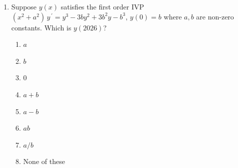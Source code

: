 \documentclass{ximera}
\begin{document}
\begin{enumerate}[label=(\arabic*)]


\newpage

\item Suppose $y(x)$ satisfies the first order IVP $(x^2+a^2)\,y^{\,\prime}=y^3-3b y^2+3b^2y-b^3$, $y(0)=b$ where $a,b$ are non-zero constants.  Which is $y(2026)$?

\begin{enumerate}[label=(\alph*)]
\item $a$
\item $b$
\item $0$
\item $a+b$
\item $a-b$
\item $ab$
\item $a/b$
\item None of these
\end{enumerate}



\end{enumerate}
\end{document}
